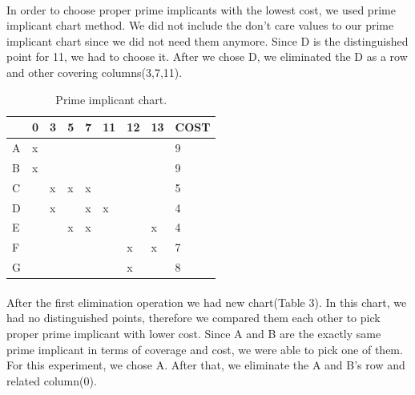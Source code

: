 \documentclass[pdftex,12pt,a4paper]{article}
\begin{document}
\paragraph{}
In order to choose proper prime implicants with the lowest cost, we used prime implicant chart method. We did not include the don't care values to our prime implicant chart since we did not need them anymore. Since D is the distinguished point for 11, we had to choose it. After we chose D, we eliminated the D as a row and other covering columns(3,7,11).
\newline
\newline
\begin{table}[h]
\centering
\begin{tabular}{l|l|l|l|l|l|l|l|l|}
\cline{2-9}
                        & 0 & 3 & 5 & 7 & 11                        & 12 & 13 & COST \\ \hline
\multicolumn{1}{|l|}{A} & x &   &   &   &                           &    &    & 9    \\ \hline
\multicolumn{1}{|l|}{B} & x &   &   &   &                           &    &    & 9    \\ \hline
\multicolumn{1}{|l|}{C} &   & x & x & x &                           &    &    & 5    \\ \hline
\multicolumn{1}{|l|}{D} &   & x &   & x & {\color[HTML]{FE0000} x}  &    &    & 4    \\ \hline
\multicolumn{1}{|l|}{E} &   &   & x & x &                           &    & x  & 4    \\ \hline
\multicolumn{1}{|l|}{F} &   &   &   &   &                           & x  & x  & 7   \\ \hline
\multicolumn{1}{|l|}{G} &   &   &   &   &                           & x  &    & 8   \\ \hline
\end{tabular}
\caption{Prime implicant chart.}
\label{primeimplicantchart1}
\end{table}

\paragraph{}
After the first elimination operation we had new chart(Table 3). In this chart, we had no distinguished points, therefore we compared them each other to pick proper prime implicant with lower cost. Since A and B are the exactly same prime implicant in terms of coverage and cost, we were able to pick one of them. For this experiment, we chose A. After that, we eliminate the A and B's row and related column(0).
\newline
\newline
\end{document}
